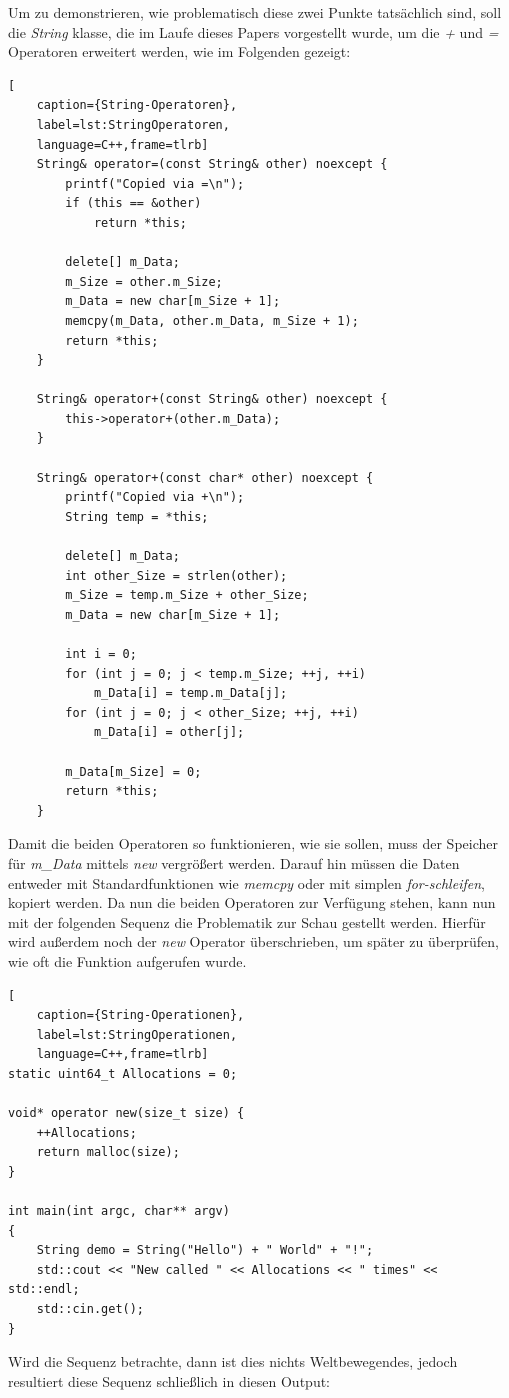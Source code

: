 Um zu demonstrieren, wie problematisch diese zwei Punkte tatsächlich sind, soll die \emph{String}
klasse, die im Laufe dieses Papers vorgestellt wurde, um die \emph{+} und \emph{=} Operatoren
erweitert werden, wie im Folgenden gezeigt:
\newpage
\begin{lstlisting}[
    caption={String-Operatoren},
    label=lst:StringOperatoren,
    language=C++,frame=tlrb]
	String& operator=(const String& other) noexcept {
		printf("Copied via =\n");
		if (this == &other)
			return *this;

		delete[] m_Data;
		m_Size = other.m_Size;
		m_Data = new char[m_Size + 1];
		memcpy(m_Data, other.m_Data, m_Size + 1);
		return *this;
	}

	String& operator+(const String& other) noexcept {
		this->operator+(other.m_Data);
	}

	String& operator+(const char* other) noexcept {
		printf("Copied via +\n");
		String temp = *this;

		delete[] m_Data;
		int other_Size = strlen(other);
		m_Size = temp.m_Size + other_Size;
		m_Data = new char[m_Size + 1];

		int i = 0;
		for (int j = 0; j < temp.m_Size; ++j, ++i)
			m_Data[i] = temp.m_Data[j];
		for (int j = 0; j < other_Size; ++j, ++i)
			m_Data[i] = other[j];

		m_Data[m_Size] = 0;
		return *this;
	}
\end{lstlisting}

Damit die beiden Operatoren so funktionieren, wie sie sollen, muss der Speicher für \emph{m\_Data}
mittels \emph{new} vergrößert werden. Darauf hin müssen die Daten entweder mit Standardfunktionen
wie \emph{memcpy} oder mit simplen \emph{for-schleifen}, kopiert werden.
\newline
\newline
Da nun die beiden Operatoren zur Verfügung stehen, kann nun mit der folgenden Sequenz die
Problematik zur Schau gestellt werden. Hierfür wird außerdem noch der \emph{new} Operator
überschrieben, um später zu überprüfen, wie oft die Funktion aufgerufen wurde.

\begin{lstlisting}[
    caption={String-Operationen},
    label=lst:StringOperationen,
    language=C++,frame=tlrb]
static uint64_t Allocations = 0;

void* operator new(size_t size) {
	++Allocations;
	return malloc(size);
}

int main(int argc, char** argv)
{
	String demo = String("Hello") + " World" + "!";
	std::cout << "New called " << Allocations << " times" << std::endl;
	std::cin.get();
}
\end{lstlisting}
Wird die Sequenz betrachte, dann ist dies nichts Weltbewegendes, jedoch resultiert diese Sequenz
schließlich in diesen Output:

